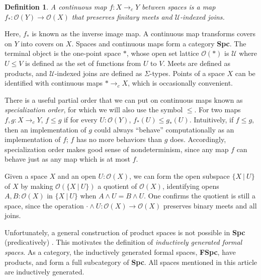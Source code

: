 \documentclass[conference]{IEEEtran}
\newtheorem{definition}{Definition}
\newcommand{\cto}{\to_c}
\newcommand{\Type}{\mathcal{U}}
\newcommand{\suchthat}{\ |\ }
\newcommand{\One}{\ast}
\newcommand{\Open}[1]{\mathcal{O}({#1})}
\newcommand{\comment}[1]{}
\begin{document}
\begin{definition}
A \emph{continuous map} $f : X \cto Y$ between spaces is a map $f_* : \Open{Y} \to \Open{X}$ that preserves finitary meets and $\Type$-indexed joins.
\end{definition}

Here, $f_*$ is known as the inverse image map. A continuous map transforms covers on $Y$ into covers on $X$. Spaces and continuous maps form a category \textbf{Spc}. The terminal object is the one-point space $\One$, whose open set lattice $\Open{\One}$ is $\Type$ where $U \le V$ is defined as the set of functions from $U$ to $V$. Meets are defined as products, and $\Type$-indexed joins are defined as $\Sigma$-types. Points of a space $X$ can be identified with continuous maps $\One \cto X$, which is occasionally convenient.

There is a useful partial order that we can put on continuous maps known as \emph{specialization order}, for which we will also use the symbol $\le$. For two maps $f, g : X \cto Y$, $f \le g$ if for every $U : \Open{Y}$, $f_*(U) \le g_*(U)$. Intuitively, if $f \le g$, then an implementation of $g$ could always ``behave'' computationally as an implementation of $f$; $f$ has no more behaviors than $g$ does. Accordingly, specialization order makes good sense of nondeterminism, since any map $f$ can behave just as any map which is at most $f$.

Given a space $X$ and an open $U : \Open{X}$, we can form the open subspace $\{ X \suchthat U \}$ of $X$ by making $\Open{\{X \suchthat U \}}$ a quotient of $\Open{X}$, identifying opens $A, B : \Open{X}$ in $\{ X \suchthat U \}$ when $A \wedge U = B \wedge U$. One confirms the quotient is still a space, since the operation $\cdot \wedge U : \Open{X} \to \Open{X}$ preserves binary meets and all joins.

Unfortunately, a general construction of product spaces is not possible in \textbf{Spc} (predicatively) \cite{coquand2003}. This motivates the definition of \emph{inductively generated formal spaces}. As a category, the inductively generated formal spaces, \textbf{FSpc}, have products, and form a full subcategory of \textbf{Spc}. All spaces mentioned in this article are inductively generated.

\comment{
\begin{definition}
An \emph{inductively generated formal space} is a preorder $S$ together with a function 
\[
C : S \to \Sigma (I : \Type).\ I \to (S \to \Type),
\]
called an \emph{axiom set}.
\end{definition}

The preorder $S$ represents a base for the opens of the space. The construction in \cite{coquand2003} generates the ``free'' space $X$ whose base is $S$, with an inclusion of the base $y : S \to \Open{X}$ that satisfies, for each $s : S$, letting $(I, U) = C(s)$, for any $i : I$, 
\begin{mathpar}
\inferrule*
  {}
  {ya \le \bigvee_{b : U_i} yb}
\end{mathpar}
}
\end{document}
